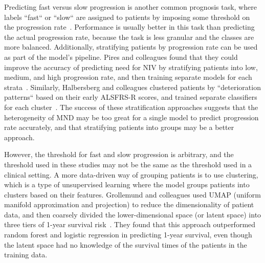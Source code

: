 Predicting fast versus slow progression is another common prognosis task, where labels ``fast`` or ``slow`` are assigned to patients by imposing some threshold on the progression rate~\cite{ongPredictingFunctionalDecline2017, dinabduljabbarPredictingAmyotrophicLateral2023}.
Performance is usually better in this task than predicting the actual progression rate, because the task is less granular and the classes are more balanced.
Additionally, stratifying patients by progression rate can be used as part of the model's pipeline.
Pires and colleagues found that they could improve the accuracy of predicting need for NIV by stratifying patients into low, medium, and high progression rate, and then training separate models for each strata~\cite{piresPredictingNoninvasiveVentilation2018}.
Similarly, Halbersberg and colleagues clustered patients by ``deterioration patterns`` based on their early ALSFRS-R scores, and trained separate classifiers for each cluster~\cite{halbersbergTemporalModelingDeterioration2019}.
The success of these stratification approaches suggests that the heterogeneity of MND may be too great for a single model to predict progression rate accurately, and that stratifying patients into groups may be a better approach.

However, the threshold for fast and slow progression is arbitrary, and the threshold used in these studies may not be the same as the threshold used in a clinical setting.
A more data-driven way of grouping patients is to use clustering, which is a type of unsupervised learning where the model groups patients into clusters based on their features.
Grollemund and colleagues used UMAP (uniform manifold approximation and projection) to reduce the dimensionality of patient data, and then coarsely divided the lower-dimensional space (or latent space) into three tiers of 1-year survival risk~\cite{grollemundDevelopmentValidation1year2020}.
They found that this approach outperformed random forest and logistic regression in predicting 1-year survival, even though the latent space had no knowledge of the survival times of the patients in the training data.

